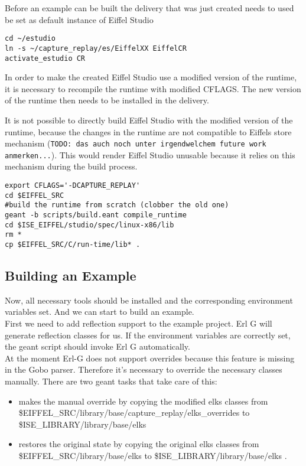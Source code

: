 Before an example can be built the delivery that was just created needs to used be set as default instance of Eiffel Studio
\begin{lstlisting}
cd ~/estudio
ln -s ~/capture_replay/es/EiffelXX EiffelCR
activate_estudio CR
\end{lstlisting}

In order to make the created Eiffel Studio use a modified version of the runtime, it is necessary to recompile the runtime with modified CFLAGS. The new version of the runtime then needs to be installed in the delivery.

It is not possible to directly build Eiffel Studio with the modified version of the runtime, because the changes in the runtime are not compatible to Eiffels store mechanism (\texttt{TODO: das auch noch unter irgendwelchem future work anmerken...}). This would render Eiffel Studio unusable because it relies on this mechanism during the build process.
\begin{lstlisting}
export CFLAGS='-DCAPTURE_REPLAY' 
cd $EIFFEL_SRC
#build the runtime from scratch (clobber the old one)
geant -b scripts/build.eant compile_runtime
cd $ISE_EIFFEL/studio/spec/linux-x86/lib
rm *
cp $EIFFEL_SRC/C/run-time/lib* .
\end{lstlisting}


\subsection{Building an Example}
Now, all necessary tools should be installed and the corresponding environment variables set. And we can start to build an example.\\
First we need to add reflection support to the example project. Erl G will generate reflection classes for us. If the environment variables are correctly set, the geant script should invoke Erl G automatically. \\
At the moment Erl-G does not support overrides because this feature is missing in the Gobo parser. Therefore it's necessary to override the necessary classes manually. There are two geant tasks that take care of this:

\begin{itemize}
\item {} makes the manual override by copying the modified elks classes from \$EIFFEL\_SRC/library/base/capture\_replay/elks\_overrides to \$ISE\_LIBRARY/library/base/elks \\
\item {} restores the original state by copying the original elks classes from \$EIFFEL\_SRC/library/base/elks to \$ISE\_LIBRARY/library/base/elks .
\end{itemize}

